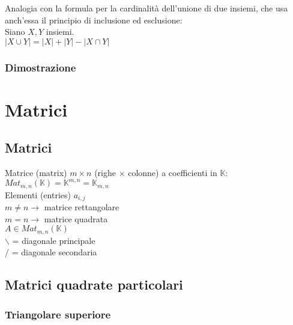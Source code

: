 \documentclass[a4paper, twoside, italian, 11pt]{book}
\newcommand{\card}[1] {\left | #1 \right |}
\newcommand{\K}{\mathbb K}
\begin{document}
\noindent
Analogia con la formula per la cardinalità dell'unione di due insiemi, che usa anch'essa il principio di inclusione ed esclusione: \\

\noindent
Siano $X, Y$ insiemi. \\

\noindent
$\card{X \cup Y} = \card X + \card Y - \card{X \cap Y}$


\subsection{Dimostrazione}




\chapter{Matrici}



\section {Matrici}

Matrice (matrix) $m \times n$ (righe $\times$ colonne) a coefficienti in $\K$: \\
$Mat_{m,n}(\K) = \K^{m,n} = \K_{m,n}$ \\

\noindent
Elementi (entries) $a_{i, j}$ \\

\noindent
$m \neq n \rightarrow$ matrice rettangolare \\
$m = n \rightarrow$ matrice quadrata \\

\noindent
$A \in Mat_{m,n}(\K)$ \\

\noindent
$\backslash$ = diagonale principale \\
$/$ = diagonale secondaria \\



\section{Matrici quadrate particolari}


\subsection{Triangolare superiore}
\end{document}
